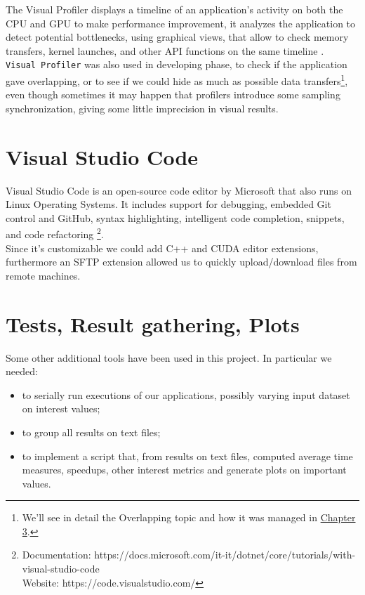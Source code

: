 	The Visual Profiler displays a timeline of an application's activity on both the CPU and GPU to make performance improvement, it analyzes the application to detect potential bottlenecks, using graphical views, that allow to check memory transfers, kernel launches, and other API functions on the same timeline \cite{profilersguide}.\\
	 
	\texttt{Visual Profiler} was also used in developing phase, to check if the application gave overlapping, or to see if we could hide as much as possible data transfers\footnote{We'll see in detail the Overlapping topic and how it was managed in \hyperref[chap:logic]{Chapter 3}.}, even though sometimes it may happen that profilers introduce some sampling synchronization, giving some little imprecision in visual results.

	
\section{Visual Studio Code}
	Visual Studio Code is an open-source code editor by Microsoft that also runs on Linux Operating Systems. It includes support for debugging, embedded Git control and GitHub, syntax highlighting, intelligent code completion, snippets, and code refactoring \footnote{Documentation: https://docs.microsoft.com/it-it/dotnet/core/tutorials/with-visual-studio-code \\ 
		Website: https://code.visualstudio.com/}.\\
	Since it's customizable we could add C++ and CUDA editor extensions, furthermore an SFTP extension allowed us to quickly upload/download files from remote machines. 	
	
	
\section{Tests, Result gathering, Plots}
	Some other additional tools have been used in this project.
	In particular we needed:
	\begin{itemize}
		\item to serially run executions of our applications, possibly varying input dataset on interest values;
		\item to group all results on text files;
		\item to implement a script that, from results on text files, computed average time measures, speedups, other interest metrics and generate plots on important values.
	\end{itemize}
	
